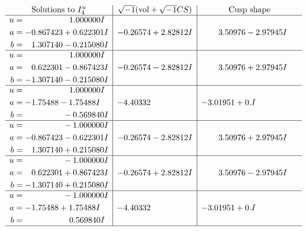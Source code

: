 \documentclass[1p]{elsarticle_modified}
\theoremstyle{definition}
\newcommand{\I}{\sqrt{-1}}
\begin{document}
$$\begin{array}{c|c|c}  
\text{Solutions to }I^u_{4}& \I (\text{vol} + \sqrt{-1}CS) & \text{Cusp shape}\\
 \hline 
\begin{aligned}
u &= \phantom{-0.000000 -}1.000000 I \\
a &= -0.867423 + 0.622301 I \\
b &= \phantom{-}1.307140 - 0.215080 I\end{aligned}
 & -0.26574 + 2.82812 I & \phantom{-}3.50976 - 2.97945 I \\ \hline\begin{aligned}
u &= \phantom{-0.000000 -}1.000000 I \\
a &= \phantom{-}0.622301 - 0.867423 I \\
b &= -1.307140 - 0.215080 I\end{aligned}
 & -0.26574 - 2.82812 I & \phantom{-}3.50976 + 2.97945 I \\ \hline\begin{aligned}
u &= \phantom{-0.000000 -}1.000000 I \\
a &= -1.75488 - 1.75488 I \\
b &= \phantom{-0.000000 } -0.569840 I\end{aligned}
 & -4.40332\phantom{ +0.000000I} & -3.01951 + 0. I\phantom{ +0.000000I} \\ \hline\begin{aligned}
u &= \phantom{-0.000000 } -1.000000 I \\
a &= -0.867423 - 0.622301 I \\
b &= \phantom{-}1.307140 + 0.215080 I\end{aligned}
 & -0.26574 - 2.82812 I & \phantom{-}3.50976 + 2.97945 I \\ \hline\begin{aligned}
u &= \phantom{-0.000000 } -1.000000 I \\
a &= \phantom{-}0.622301 + 0.867423 I \\
b &= -1.307140 + 0.215080 I\end{aligned}
 & -0.26574 + 2.82812 I & \phantom{-}3.50976 - 2.97945 I \\ \hline\begin{aligned}
u &= \phantom{-0.000000 } -1.000000 I \\
a &= -1.75488 + 1.75488 I \\
b &= \phantom{-0.000000 -}0.569840 I\end{aligned}
 & -4.40332\phantom{ +0.000000I} & -3.01951 + 0. I\phantom{ +0.000000I}\\
 \hline 
 \end{array}$$\newpage\newpage\renewcommand{\arraystretch}{1}
\end{document}
